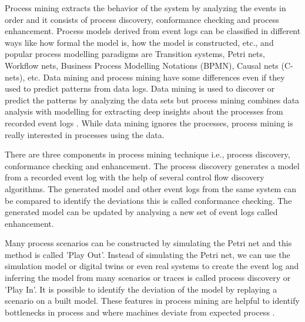\documentclass[conference]{IEEEtran}
\begin{document}
 Process mining \cite{van2012process1}  extracts the behavior of the system by analyzing the events in order and it consists of process discovery, conformance checking and process enhancement. Process models derived from event logs can be classified in different ways like how formal the model is, how the model is constructed, etc., and popular process modelling paradigms are Transition systems, Petri nets, Workflow nets, Business Process Modelling Notations (BPMN), Causal nets (C-nets),  etc. Data mining and process mining have some differences even if they used to predict patterns from data logs. Data mining is used to discover or predict the patterns by analyzing the data sets but process mining combines data analysis with modelling for extracting deep insights about the processes from recorded event logs  \cite{van2016process}. While data mining ignores the processes, process mining is really interested in processes using the data.
 
 There are three components in process mining technique \cite{van2012process2} i.e., process discovery, conformance checking and enhancement. The process discovery generates a model from a recorded event log with the help of several control flow discovery algorithms. The generated model and other event logs from the same system can be compared to identify the deviations this is called conformance checking. The generated model can be updated by analysing a new set of event logs called enhancement.

Many process scenarios can be constructed by simulating the Petri net \cite{petri1962} and this method is called 'Play Out'. Instead of simulating the Petri net, we can use the simulation model or digital twins or even real systems to create the event log and inferring the model from many scenarios or traces is called process discovery or 'Play In'. It is possible to identify the deviation of the model by replaying a scenario on a built model. These features in process mining are helpful to identify bottlenecks in process and where machines deviate from expected process \cite{aalst2011process}.
\end{document}
